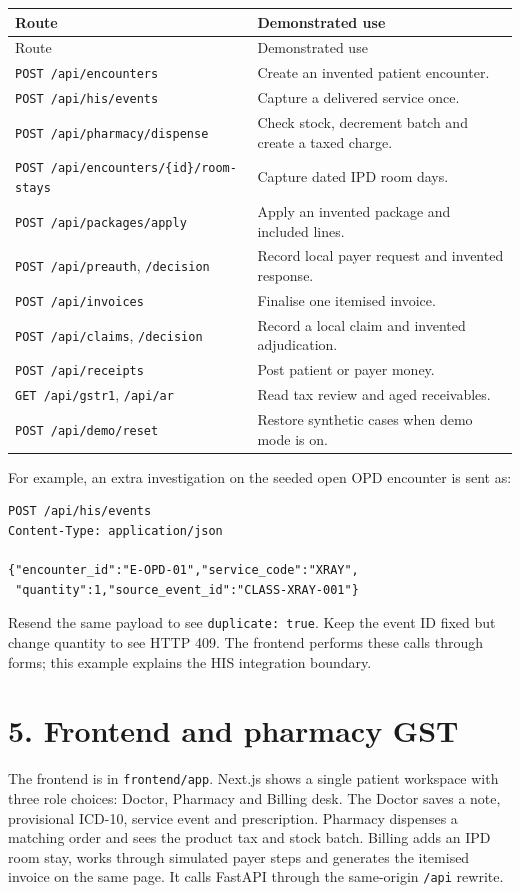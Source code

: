 \documentclass[11pt,a4paper]{article}
\newcommand{\sect}[1]{\section*{\color{navy}#1}\addcontentsline{toc}{section}{#1}}
\begin{document}
\begin{longtable}{p{}p{}}
\toprule
Route & Demonstrated use\\\midrule\endfirsthead
\toprule Route & Demonstrated use\\\midrule\endhead
\texttt{POST /api/encounters} & Create an invented patient encounter.\\
\texttt{POST /api/his/events} & Capture a delivered service once.\\
\texttt{POST /api/pharmacy/dispense} & Check stock, decrement batch and create a taxed charge.\\
\texttt{POST /api/encounters/\{id\}/room-stays} & Capture dated IPD room days.\\
\texttt{POST /api/packages/apply} & Apply an invented package and included lines.\\
\texttt{POST /api/preauth}, \texttt{/decision} & Record local payer request and invented response.\\
\texttt{POST /api/invoices} & Finalise one itemised invoice.\\
\texttt{POST /api/claims}, \texttt{/decision} & Record a local claim and invented adjudication.\\
\texttt{POST /api/receipts} & Post patient or payer money.\\
\texttt{GET /api/gstr1}, \texttt{/api/ar} & Read tax review and aged receivables.\\
\texttt{POST /api/demo/reset} & Restore synthetic cases when demo mode is on.\\
\bottomrule
\end{longtable}
For example, an extra investigation on the seeded open OPD encounter is sent as:
\begin{lstlisting}
POST /api/his/events
Content-Type: application/json

{"encounter_id":"E-OPD-01","service_code":"XRAY",
 "quantity":1,"source_event_id":"CLASS-XRAY-001"}
\end{lstlisting}
Resend the same payload to see \texttt{duplicate: true}. Keep the event ID fixed but change quantity to see HTTP 409. The frontend performs these calls through forms; this example explains the HIS integration boundary.

\newpage
\sect{5. Frontend and pharmacy GST}
The frontend is in \texttt{frontend/app}. Next.js shows a single patient workspace with three role choices: Doctor, Pharmacy and Billing desk. The Doctor saves a note, provisional ICD-10, service event and prescription. Pharmacy dispenses a matching order and sees the product tax and stock batch. Billing adds an IPD room stay, works through simulated payer steps and generates the itemised invoice on the same page. It calls FastAPI through the same-origin \texttt{/api} rewrite.
\end{document}
